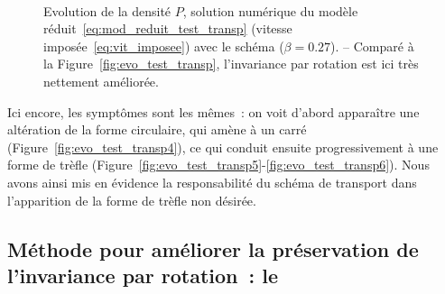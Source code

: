 \documentclass[main.tex]{subfiles}
\begin{document}
\begin{figure}
\centering
\\
\caption{Evolution de la densité $P$, solution numérique du modèle réduit~\eqref{eq:mod_reduit_test_transp} (vitesse imposée~\eqref{eq:vit_imposee}) avec le schéma \twinweno ($\beta=0.27$). -- Comparé à la Figure~\ref{fig:evo_test_transp}, l'invariance par rotation est ici très nettement améliorée. \label{fig:evo_test_transp_twinweno}}
\end{figure}
Ici encore, les symptômes sont les mêmes~: on voit d'abord apparaître une altération de la forme circulaire, qui amène à un carré (\cf  Figure~\ref{fig:evo_test_transp4}), ce qui conduit ensuite  progressivement à une forme de trèfle (\cf  Figure~\ref{fig:evo_test_transp5}-\ref{fig:evo_test_transp6}).
Nous avons ainsi mis en évidence la responsabilité du schéma de transport dans l'apparition de la forme de trèfle non désirée.


\subsection{Méthode pour améliorer la préservation de l'invariance par rotation~: le \twinweno  \label{sec:twinweno}}
%
\end{document}
